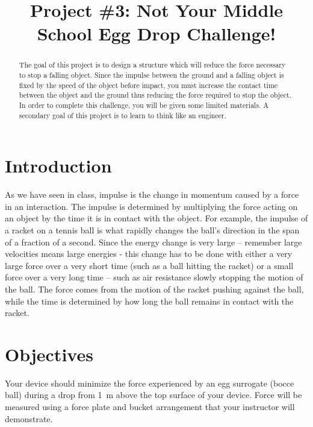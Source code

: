 \documentclass[hw]{exam}
\title{Project \#3: Not Your Middle School Egg Drop Challenge!}
\date{\printdate{5/3/2021}}
\author{\mobeardInstructorShort}
\begin{document}
\maketitle

\begin{abstract}
The goal of this project is to design a structure which will reduce the force necessary to stop a falling object.  Since the impulse between the ground and a falling object is fixed by the speed of the object before impact, you must increase the contact time between the object and the ground thus reducing the force required to stop the object. In order to complete this challenge, you will be given some limited materials. A secondary goal of this project is to learn to think like an engineer. 
\end{abstract}

\section{Introduction}
As we have seen in class, impulse is the change in momentum caused by a force in an interaction. The impulse is determined by multiplying the force acting on an object by the time it is in contact with the object. For example, the impulse of a racket on a tennis ball is what rapidly changes the ball’s direction in the span of a fraction of a second. Since the energy change is very large -- remember large velocities means large energies - this change has to be done with either a very large force over a very short time (such as a ball hitting the racket) or a small force over a very long time -- such as air resistance slowly stopping the motion of the ball. The force comes from the motion of the racket pushing against the ball, while the time is determined by how long the ball remains in contact with the racket. 
 
\section{Objectives}
Your device should minimize the force experienced by an egg surrogate (bocce ball) during a drop from \SI{1}{\meter} above the top surface of your device. Force will be measured using a force plate and bucket arrangement that your instructor will demonstrate. 
 
\end{document}
